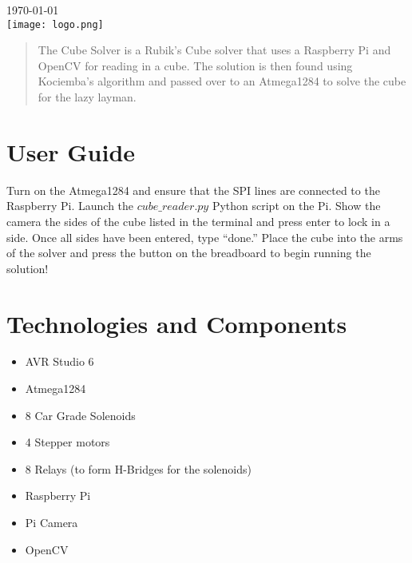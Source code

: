 \begin{titlepage}

{\large \today}\\[2cm] %

\texttt{[image: logo.png]}\\[1cm] %

\vfill %

\end{titlepage}


\begin{abstract}
The Cube Solver is a Rubik’s Cube solver that uses a Raspberry Pi and OpenCV for reading in a cube. The solution is then found using Kociemba’s algorithm and passed over to an Atmega1284 to solve the cube for the lazy layman.
\end{abstract}

\section{User Guide}

Turn on the Atmega1284 and ensure that the SPI lines are connected to the Raspberry Pi. Launch the $cube\_reader.py$ Python script on the Pi. Show the camera the sides of the cube listed in the terminal and press enter to lock in a side. Once all sides have been entered, type “done.” Place the cube into the arms of the solver and press the button on the breadboard to begin running the solution! 

\section{Technologies and Components}

\begin{itemize}
	\item AVR Studio 6
	\item Atmega1284
	\item 8 Car Grade Solenoids
	\item 4 Stepper motors
	\item 8 Relays (to form H-Bridges for the solenoids)
	\item Raspberry Pi
	\item Pi Camera
	\item OpenCV
\end{itemize}

